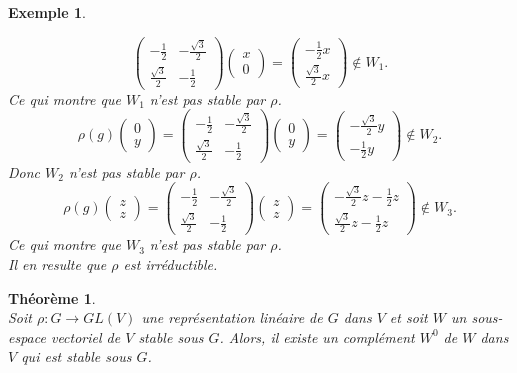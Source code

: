 \documentclass[a4paper, 14pt]{report}
\newtheorem{example}{Exemple}[section]
\newtheorem{theorem}{Théorème}[section]
\begin{document}
\begin{onehalfspace}
{\begin{example}
\begin{enumerate}
\[		\begin{pmatrix} -\frac{1}{2} & -\frac{\sqrt{3}}{2} \\ \frac{\sqrt{3}}{2} & -\frac{1}{2} \end{pmatrix} 
		\begin{pmatrix} x \\ 0 \end{pmatrix} = 
		\begin{pmatrix} -\frac{1}{2}x \\ \frac{\sqrt{3}}{2}x \end{pmatrix}
		\notin W_1.
		\]
		Ce qui montre que \(W_1\) n'est pas stable par \(\rho\).		
		\[
		\rho(g) \begin{pmatrix} 0 \\ y \end{pmatrix} = 
		\begin{pmatrix} -\frac{1}{2} & -\frac{\sqrt{3}}{2} \\ \frac{\sqrt{3}}{2} & -\frac{1}{2} \end{pmatrix} 
		\begin{pmatrix} 0 \\ y \end{pmatrix} = 
		\begin{pmatrix} -\frac{\sqrt{3}}{2}y \\ -\frac{1}{2}y \end{pmatrix}
		\notin W_2.
		\]
		Donc \(W_2\) n'est pas stable par \(\rho\).
		\[
		\rho(g) \begin{pmatrix} z \\ z \end{pmatrix} = 
		\begin{pmatrix} -\frac{1}{2} & -\frac{\sqrt{3}}{2} \\ \frac{\sqrt{3}}{2} & -\frac{1}{2} \end{pmatrix} 
		\begin{pmatrix} z \\ z \end{pmatrix} = 
		\begin{pmatrix} -\frac{\sqrt{3}}{2}z - \frac{1}{2}z \\ \frac{\sqrt{3}}{2}z - \frac{1}{2}z \end{pmatrix}
		\notin W_3.
		\]
		Ce qui montre que \(W_3\) n'est pas stable par \(\rho\).\\
		Il en resulte que \( \rho \) est irréductible.
	\end{enumerate}
\end{example}


\begin{theorem}\cite{serre1971representation} \\
Soit $\rho : G \to GL(V)$ une représentation linéaire de $G$ dans $V$ et soit 
$W$ un sous-espace vectoriel de $V$ stable sous $G$. Alors, il existe un complément $W^0$ de $W$ dans $V$ qui est stable sous $G$.
\end{theorem}

}
\end{onehalfspace}
\end{document}
